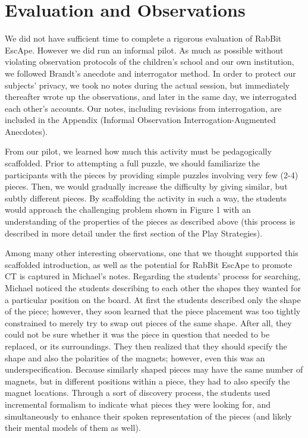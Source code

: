 \documentclass{acm_proc_article-sp}
\begin{document}
\section{Evaluation and Observations}
We did not have sufficient time to complete a rigorous evaluation of RabBit EscApe. However we did run an informal pilot. As much as possible without violating observation protocols of the children’s school and our own institution, we followed Brandt’s anecdote and interrogator method. In order to protect our subjects’ privacy, we took no notes during the actual session, but immediately thereafter wrote up the observations, and later in the same day, we interrogated each other’s accounts. Our notes, including revisions from interrogation, are included in the Appendix (Informal Observation Interrogation-Augmented Anecdotes).

From our pilot, we learned how much this activity must be pedagogically scaffolded. Prior to attempting a full puzzle, we should familiarize the participants with the pieces by providing simple puzzles involving very few (2-4) pieces. Then, we would gradually increase the difficulty by giving similar, but subtly different pieces. By scaffolding the activity in such a way, the students would approach the challenging problem shown in Figure 1 with an understanding of the properties of the pieces as described above (this process is described in more detail under the first section of the Play Strategies).

Among many other interesting observations, one that we thought supported this scaffolded introduction, as well as the potential for RabBit EscApe to promote CT is captured in Michael’s notes. Regarding the students’ process for searching, Michael noticed the students describing to each other the shapes they wanted for a particular position on the board. At first the students described only the shape of the piece; however, they soon learned that the piece placement was too tightly constrained to merely try to swap out pieces of the same shape. After all, they could not be sure whether it was the piece in question that needed to be replaced, or its surroundings. They then realized that they should specify the shape and also the polarities of the magnets; however, even this was an underspecification. Because similarly shaped pieces may have the same number of magnets, but in different positions within a piece, they had to also specify the magnet locations. Through a sort of discovery process, the students used incremental formalism to indicate what pieces they were looking for, and simultaneously to enhance their spoken representation of the pieces (and likely their mental models of them as well).
\end{document}
